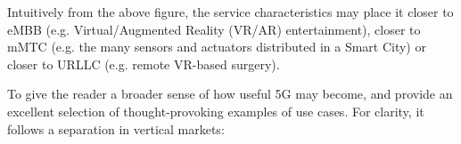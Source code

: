 


Intuitively from the above figure, the service characteristics may place it closer to eMBB (e.g. Virtual/Augmented Reality (VR/AR) entertainment), closer to mMTC (e.g. the many sensors and actuators distributed in a Smart City) or closer to URLLC (e.g. remote VR-based surgery). 

To give the reader a broader sense of how useful \ac{5G} may become, \cite{5gbook1} and \cite{5gbook2} provide an excellent selection of thought-provoking examples of use cases. For clarity, it follows a separation in vertical markets:%


